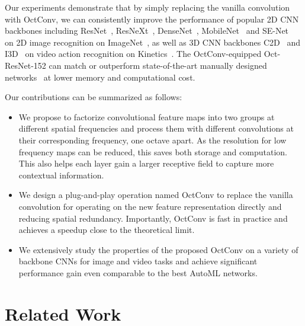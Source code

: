 \documentclass[10pt,twocolumn,letterpaper]{article}
\newcommand{\hiConvPrefix}[0]{Oct\xspace}
\newcommand{\hiConv}[0]{OctConv\xspace}
\begin{document}
Our experiments demonstrate that by simply replacing the vanilla convolution with \hiConv, we can consistently improve the performance of popular 2D CNN backbones including ResNet~\cite{ResNetV1,ResNetV2}, ResNeXt~\cite{ResNeXt}, DenseNet~\cite{densenet}, MobileNet~\cite{MobileNetV1,MobileNetV2} and SE-Net~\cite{SENet} on 2D image recognition on ImageNet~\cite{imagenet}, as well as 3D CNN backbones C2D~\cite{nonlocal} and I3D~\cite{nonlocal} on video action recognition on Kinetics~\cite{kay2017kinetics, k400, k600}. The \hiConv-equipped \hiConvPrefix-ResNet-152 can match or outperform state-of-the-art manually designed networks~\cite{ShuffleNetV2,SENet} at lower memory and computational cost.

\noindent
Our contributions can be summarized as follows:
\begin{itemize}[leftmargin=*,noitemsep,nolistsep]
\item  We propose to factorize convolutional feature maps into two groups at different spatial frequencies and process them with different convolutions at their corresponding frequency, one octave apart. As the resolution for low frequency maps can be reduced, this saves both storage and computation. This also helps each layer gain a larger receptive field to capture more contextual information.
\item  We design a plug-and-play operation named \hiConv to replace the vanilla convolution for operating on the new feature representation directly and reducing spatial redundancy. Importantly, \hiConv is fast in practice and 
achieves a speedup close to the theoretical limit.
\item  We extensively study the properties of the proposed \hiConv on a variety of backbone CNNs for image and video tasks and achieve significant performance gain even comparable to the best AutoML networks.
\end{itemize}


 

\section{Related Work}
\end{document}
